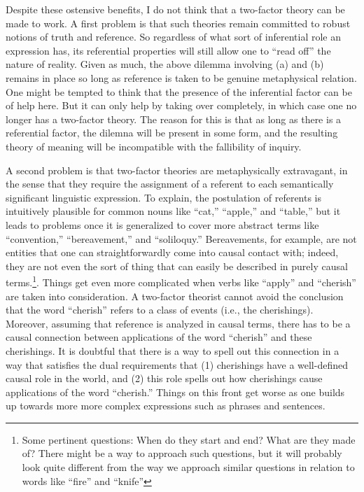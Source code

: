 Despite these ostensive benefits, I do not think that a two-factor theory can be made to work. A first problem is that such theories remain committed to robust notions of truth and reference. So regardless of what sort of inferential role an expression has, its referential properties will still allow one to ``read off'' the nature of reality. Given as much, the above dilemma involving (a) and (b) remains in place so long as reference is taken to be genuine metaphysical relation. One might be tempted to think that the presence of the inferential factor can be of help here. But it can only help by taking over completely, in which case one no longer has a two-factor theory. The reason for this is that as long as there is a referential factor, the dilemna will be present in some form, and the resulting theory of meaning will be incompatible with the fallibility of inquiry. 

A second problem is that two-factor theories are metaphysically extravagant, in the sense that they require the assignment of a referent to each semantically significant linguistic expression. To explain, the postulation of referents is intuitively plausible for common nouns like ``cat,'' ``apple,'' and ``table,'' but it leads to problems once it is generalized to cover more abstract terms like ``convention,'' ``bereavement,'' and ``soliloquy.'' Bereavements, for example, are not entities that one can straightforwardly come into causal contact with; indeed, they are not even the sort of thing that can easily be described in purely causal terms.\footnote{Some pertinent questions: When do they start and end? What are they made of? There might be a way to approach such questions, but it will probably look quite different from the way we approach similar questions in relation to words like ``fire'' and ``knife''}. Things get even more complicated when verbs like ``apply'' and ``cherish'' are taken into consideration. A two-factor theorist cannot avoid the conclusion that the word ``cherish'' refers to a class of events (i.e., the cherishings). Moreover, assuming that reference is analyzed in causal terms, there has to be a causal connection between applications of the word ``cherish'' and these cherishings. It is doubtful that there is a way to spell out this connection in a way that satisfies the dual requirements that (1) cherishings have a well-defined causal role in the world, and (2) this role spells out how cherishings cause applications of the word ``cherish.'' Things on this front get worse as one builds up towards more more complex expressions such as phrases and sentences. 

